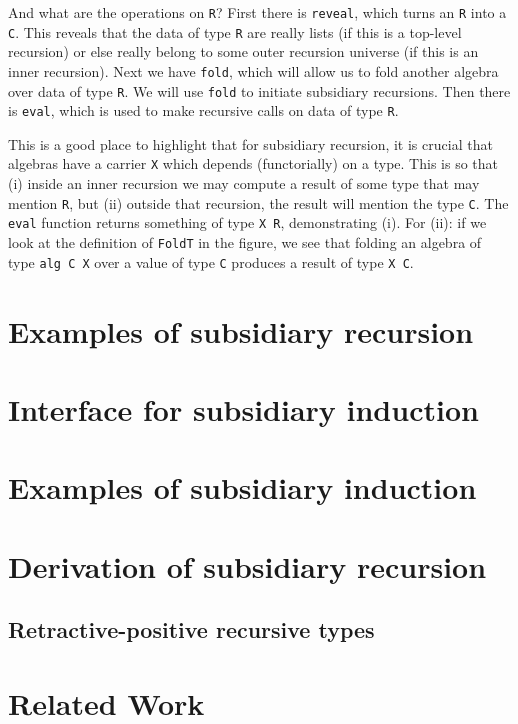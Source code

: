 \documentclass[a4paper,USenglish]{lipics-v2021}
\begin{document}
And what are the operations on \verb|R|?  First there is \verb|reveal|, which
turns an \verb|R| into a \verb|C|.  This reveals that the data of type
\verb|R| are really lists (if this is a top-level recursion) or else
really belong to some outer recursion universe (if this is an inner
recursion).  Next we have \texttt{fold}, which will allow us to fold
another algebra over data of type \verb|R|.  We will use \verb|fold|
to initiate subsidiary recursions.  Then there is \verb|eval|, which
is used to make recursive calls on data of type \verb|R|.

This is a good place to highlight that for subsidiary recursion, it is
crucial that algebras have a carrier \verb|X| which depends
(functorially) on a type.  This is so that (i) inside an inner
recursion we may compute a result of some type that may mention
\verb|R|, but (ii) outside that recursion, the result will mention the
type \verb|C|.  The \verb|eval| function returns something of type
\verb|X R|, demonstrating (i).  For (ii): if we look at the definition
of \verb|FoldT| in the figure, we see that folding an algebra of type
\verb|alg C X| over a value of type \verb|C| produces a result of type
\verb|X C|.

\section{Examples of subsidiary recursion}
\label{sec:examples}

\section{Interface for subsidiary induction}
\label{sec:interfacei}

\section{Examples of subsidiary induction}
\label{sec:interfacei}

\section{Derivation of subsidiary recursion}
\label{sec:deriv}

\subsection{Retractive-positive recursive types}
\label{sec:mu}

\section{Related Work}
\label{sec:related}
\end{document}
